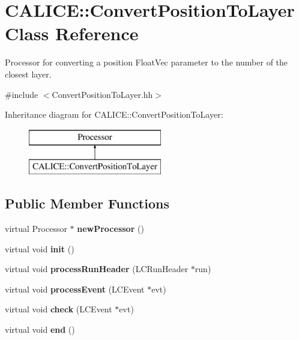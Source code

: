 \section{C\-A\-L\-I\-C\-E\-:\-:Convert\-Position\-To\-Layer Class Reference}
\label{classCALICE_1_1ConvertPositionToLayer}


Processor for converting a position Float\-Vec parameter to the number of the closest layer.  




{\ttfamily \#include $<$Convert\-Position\-To\-Layer.\-hh$>$}

Inheritance diagram for C\-A\-L\-I\-C\-E\-:\-:Convert\-Position\-To\-Layer\-:\begin{figure}[H]
\begin{center}
\leavevmode
\includegraphics[height=2.000000cm]{classCALICE_1_1ConvertPositionToLayer}
\end{center}
\end{figure}
\subsection*{Public Member Functions}
\begin{DoxyCompactItemize}
\item 
virtual Processor $\ast$ {\bfseries new\-Processor} ()\label{classCALICE_1_1ConvertPositionToLayer_a19c62a73c4ea6636b31e98780dfe4dbd}

\item 
virtual void {\bf init} ()
\item 
virtual void {\bf process\-Run\-Header} (L\-C\-Run\-Header $\ast$run)
\item 
virtual void {\bf process\-Event} (L\-C\-Event $\ast$evt)
\item 
virtual void {\bfseries check} (L\-C\-Event $\ast$evt)\label{classCALICE_1_1ConvertPositionToLayer_a87177a62a9c55eda1209410efd4b7481}

\item 
virtual void {\bf end} ()
\end{DoxyCompactItemize}

